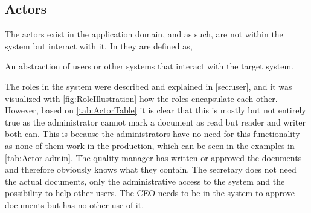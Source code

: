 \subsection{Actors}\label{sec:Actors}
The actors exist in the application domain, and as such, are not within the system but interact with it.
In \citep[p.~121]{Rod-Aalborg} they are defined as,

\begin{defn}
An abstraction of users or other systems that interact with the target system. 
\end{defn}

The roles in the system were described and explained in \cref{sec:user}, and it was visualized with \cref{fig:RoleIllustration} how the roles encapsulate each other.
However, based on \cref{tab:ActorTable} it is clear that this is mostly but not entirely true as the administrator cannot mark a document as read but reader and writer both can.
This is because the administrators have no need for this functionality as none of them work in the production, which can be seen in the examples in \cref{tab:Actor-admin}.
The quality manager has written or approved the documents and therefore obviously knows what they contain.
The secretary does not need the actual documents, only the administrative access to the system and the possibility to help other users.
The CEO needs to be in the system to approve documents but has no other use of it.

